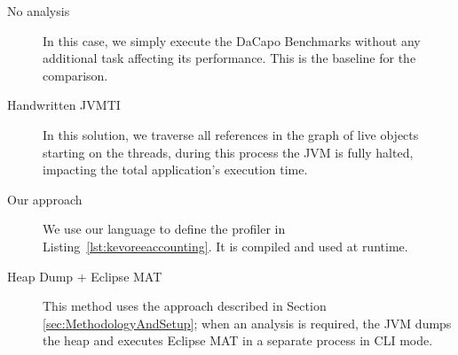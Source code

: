 \begin{description}
\item[No analysis] In this case, we simply execute the DaCapo Benchmarks without any additional task affecting its performance. This is the baseline for the comparison.  

\item[Handwritten JVMTI] In this solution, we traverse all references in the graph of live objects starting on the threads, during this process the JVM is fully halted, impacting the total application's execution time.

\item[Our approach] We use our language to define the profiler in Listing~\ref{lst:kevoreeaccounting}. It is compiled and used at runtime.

\item[Heap Dump + Eclipse MAT] This method uses the approach described in Section \ref{sec:MethodologyAndSetup}; when an analysis is required, the JVM dumps the heap and executes Eclipse MAT in a separate process in CLI mode.
\end{description}




